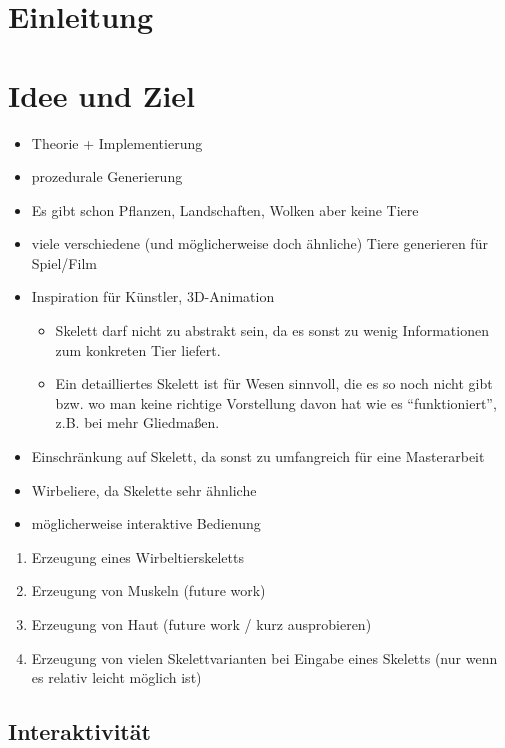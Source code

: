 \chapter{Einleitung}


\chapter{Idee und Ziel}

\begin{itemize}
 \item Theorie + Implementierung
 \item prozedurale Generierung
 \item Es gibt schon Pflanzen, Landschaften, Wolken \etc aber keine Tiere
 \item viele verschiedene (und möglicherweise doch ähnliche) Tiere generieren für Spiel/Film
 \item Inspiration für Künstler, 3D-Animation
    \begin{itemize}
     \item Skelett darf nicht zu abstrakt sein, da es sonst zu wenig Informationen zum konkreten Tier liefert.
     \item Ein detailliertes Skelett ist für Wesen sinnvoll, die es so noch nicht gibt bzw. wo man keine richtige Vorstellung davon hat wie es "`funktioniert"', z.B. bei mehr Gliedmaßen.
    \end{itemize}
 \item Einschränkung auf Skelett, da sonst zu umfangreich für eine Masterarbeit
 \item Wirbeliere, da Skelette sehr ähnliche
 \item möglicherweise interaktive Bedienung
\end{itemize}

\begin{enumerate}
 \item Erzeugung eines Wirbeltierskeletts
 \item Erzeugung von Muskeln (future work)
 \item Erzeugung von Haut (future work / kurz ausprobieren)
 \item Erzeugung von vielen Skelettvarianten bei Eingabe eines Skeletts (nur wenn es relativ leicht möglich ist)
\end{enumerate}

\section{Interaktivität}

